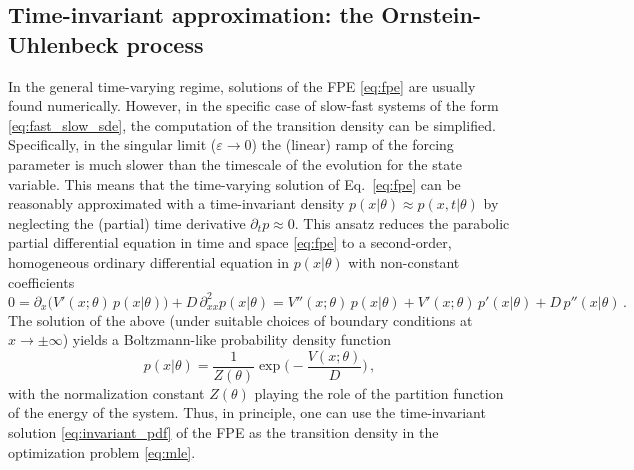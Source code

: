 \documentclass[10pt]{article}
\begin{document}
\subsection{Time-invariant approximation: the Ornstein-Uhlenbeck process}\label{subsec:oup}
In the general time-varying regime, solutions of the FPE \eqref{eq:fpe} are usually found numerically.
However, in the specific case of slow-fast systems of the form \eqref{eq:fast_slow_sde}, the computation of the transition density can be simplified. 
Specifically, in the singular limit ($\varepsilon\to0$) the (linear) ramp of the forcing parameter is much slower than the timescale of the evolution for the state variable. 
This means that the time-varying solution of Eq.~\eqref{eq:fpe} can be reasonably approximated with a time-invariant density $p(x|\theta)\approx p(x,t|\theta)$ by neglecting the (partial) time derivative $\partial_{t}p\approx0$.
This ansatz reduces the parabolic partial differential equation in time and space \eqref{eq:fpe} to a second-order, homogeneous ordinary differential equation in $p(x|\theta)$ with non-constant coefficients
%
\begin{equation}\label{eq:stationary_fpe}
        0 = \partial_{x}\big(V'(x;\theta)\,p(x|\theta)\big) + D\,\partial_{xx}^{2}p(x|\theta) = V''(x;\theta)\,p(x|\theta) + V'(x;\theta)\,p'(x|\theta) + D\,p''(x|\theta)\,.
\end{equation}
%
The solution of the above (under suitable choices of boundary conditions at $x\to\pm\infty$) yields a Boltzmann-like probability density function \cite[Ch. 5, p. 98]{Risken1989}
%
\begin{equation}\label{eq:invariant_pdf}
        p(x|\theta) = \frac{1}{Z(\theta)}\exp\bigg(-\frac{V(x;\theta)}{D}\bigg)\,,
\end{equation}
%
with the normalization constant $Z(\theta)$ playing the role of the partition function of the energy of the system.
Thus, in principle, one can use the time-invariant solution \eqref{eq:invariant_pdf} of the FPE as the transition density in the optimization problem \eqref{eq:mle}.
\end{document}
